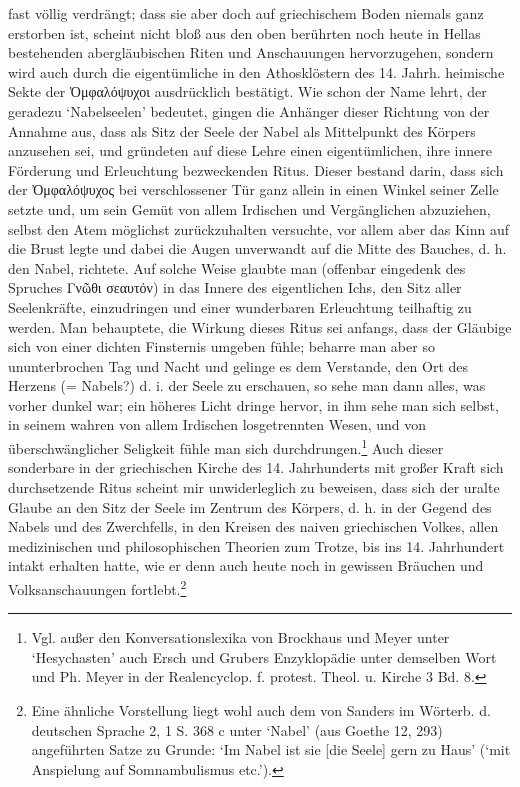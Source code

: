 \documentclass[a4paper, 11pt, oneside]{article}
\begin{document}
fast völlig verdrängt; dass sie aber doch auf griechischem Boden niemals ganz erstorben ist, scheint nicht bloß aus den oben berührten noch heute in Hellas bestehenden abergläubischen Riten und Anschauungen hervorzugehen, sondern wird auch durch die eigentümliche in den Athosklöstern des 14. Jahrh. heimische Sekte der Ὀμφαλόψυχοι ausdrücklich bestätigt. Wie schon der Name lehrt, der geradezu `Nabelseelen' bedeutet, gingen die Anhänger dieser Richtung von der Annahme aus, dass als Sitz der Seele der Nabel als Mittelpunkt des Körpers anzusehen sei, und gründeten auf diese Lehre einen eigentümlichen, ihre innere Förderung und Erleuchtung bezweckenden Ritus. Dieser bestand darin, dass sich der Ὀμφαλόψυχος bei verschlossener Tür ganz allein in einen Winkel seiner Zelle setzte und, um sein Gemüt von allem Irdischen und Vergänglichen abzuziehen, selbst den Atem möglichst zurückzuhalten versuchte, vor allem aber das Kinn auf die Brust legte und dabei die Augen unverwandt auf die Mitte des Bauches, d. h. den Nabel, richtete. Auf solche Weise glaubte man (offenbar eingedenk des Spruches Γνῶθι σεαυτόν) in das Innere des eigentlichen Ichs, den Sitz aller Seelenkräfte, einzudringen und einer wunderbaren Erleuchtung teilhaftig zu werden. Man behauptete, die Wirkung dieses Ritus sei anfangs, dass der Gläubige sich von einer dichten Finsternis umgeben fühle; beharre man aber so ununterbrochen Tag und Nacht und gelinge es dem Verstande, den Ort des Herzens (= Nabels?) d. i. der Seele zu erschauen, so sehe man dann alles, was vorher dunkel war; ein höheres Licht dringe hervor, in ihm sehe man sich selbst, in seinem wahren von allem Irdischen losgetrennten Wesen, und von überschwänglicher Seligkeit fühle man sich durchdrungen.\footnote{Vgl. außer den Konversationslexika von Brockhaus und Meyer unter `Hesychasten' auch Ersch und Grubers Enzyklopädie unter demselben Wort und Ph. Meyer in der Realencyclop. f. protest. Theol. u. Kirche 3 Bd. 8.} Auch dieser sonderbare in der griechischen Kirche des 14. Jahrhunderts mit großer Kraft sich durchsetzende Ritus scheint mir unwiderleglich zu beweisen, dass sich der uralte Glaube an den Sitz der Seele im Zentrum des Körpers, d. h. in der Gegend des Nabels und des Zwerchfells, in den Kreisen des naiven griechischen Volkes, allen medizinischen und philosophischen Theorien zum Trotze, bis ins 14. Jahrhundert intakt erhalten hatte, wie er denn auch heute noch in gewissen Bräuchen und Volksanschauungen fortlebt.\footnote{Eine ähnliche Vorstellung liegt wohl auch dem von Sanders im Wörterb. d. deutschen Sprache 2, 1 S. 368 c unter `Nabel' (aus Goethe 12, 293) angeführten Satze zu Grunde: `Im Nabel ist sie [die Seele] gern zu Haus' (`mit Anspielung auf Somnambulismus etc.').}
\clearpage
\end{document}
